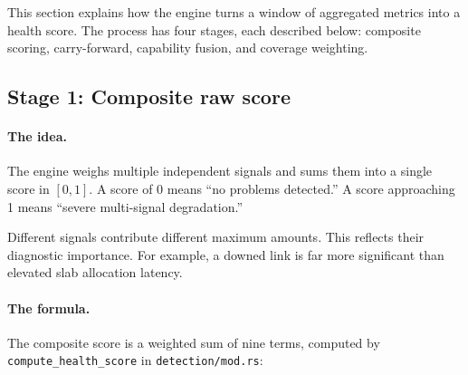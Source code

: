 \documentclass[11pt]{article}
\begin{document}
This section explains how the engine turns a window of aggregated metrics
into a health score. The process has four stages, each described below:
composite scoring, carry-forward, capability fusion, and coverage weighting.

\subsection{Stage 1: Composite raw score}
\label{sec:composite-score}

\paragraph{The idea.}
The engine weighs multiple independent signals and sums them into a single
score in $[0, 1]$. A score of 0 means ``no problems detected.'' A score
approaching 1 means ``severe multi-signal degradation.''

Different signals contribute different maximum amounts. This reflects their
diagnostic importance. For example, a downed link is far more significant
than elevated slab allocation latency.

\paragraph{The formula.}
The composite score is a weighted sum of nine terms, computed by
\texttt{compute\_health\_score} in \texttt{detection/mod.rs}:
\end{document}
